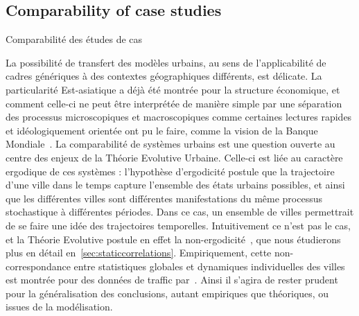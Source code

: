 


\subsection{Comparability of case studies}{Comparabilité des études de cas}


La possibilité de transfert des modèles urbains, au sens de l'applicabilité de cadres génériques à des contextes géographiques différents, est délicate. La particularité Est-asiatique a déjà été montrée pour la structure économique, et comment celle-ci ne peut être interprétée de manière simple par une séparation des processus microscopiques et macroscopiques comme certaines lectures rapides et idéologiquement orientée ont pu le faire, comme la vision de la Banque Mondiale~\cite{amsden1994isn}. La comparabilité de systèmes urbains est une question ouverte au centre des enjeux de la Théorie Evolutive Urbaine. Celle-ci est liée au caractère ergodique de ces systèmes : l'hypothèse d'ergodicité postule que la trajectoire d'une ville dans le temps capture l'ensemble des états urbains possibles, et ainsi que les différentes villes sont différentes manifestations du même processus stochastique à différentes périodes. Dans ce cas, un ensemble de villes permettrait de se faire une idée des trajectoires temporelles. Intuitivement ce n'est pas le cas, et la Théorie Evolutive postule en effet la non-ergodicité~\cite{pumain2012urban}, que nous étudierons plus en détail en~\ref{sec:staticcorrelations}. Empiriquement, cette non-correspondance entre statistiques globales et dynamiques individuelles des villes est montrée pour des données de traffic par~\cite{2017arXiv171009559D}. Ainsi il s'agira de rester prudent pour la généralisation des conclusions, autant empiriques que théoriques, ou issues de la modélisation.








\stars




